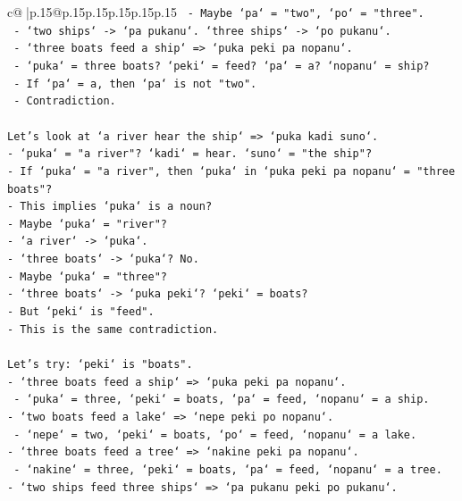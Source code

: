 \documentclass{article}
\begin{document}
{\begin{supertabular}{c@{$\;$}|p{.15\linewidth}@{}p{.15\linewidth}p{.15\linewidth}p{.15\linewidth}p{.15\linewidth}p{.15\linewidth}}
{{{\texttt{  {-} Maybe `pa` = "two", `po` = "three".} \\
\texttt{  {-} `two ships` {-}> `pa pukanu`. `three ships` {-}> `po pukanu`.} \\
\texttt{  {-} `three boats feed a ship` => `puka peki pa nopanu`.} \\
\texttt{    {-} `puka` = three boats? `peki` = feed? `pa` = a? `nopanu` = ship?} \\
\texttt{    {-} If `pa` = a, then `pa` is not "two".} \\
\texttt{    {-} Contradiction.} \\
\\ 
\texttt{Let's look at `a river hear the ship` => `puka kadi suno`.} \\
\texttt{{-} `puka` = "a river"? `kadi` = hear. `suno` = "the ship"?} \\
\texttt{{-} If `puka` = "a river", then `puka` in `puka peki pa nopanu` = "three boats"?} \\
\texttt{{-} This implies `puka` is a noun?} \\
\texttt{{-} Maybe `puka` = "river"?} \\
\texttt{{-} `a river` {-}> `puka`.} \\
\texttt{{-} `three boats` {-}> `puka`? No.} \\
\texttt{{-} Maybe `puka` = "three"?} \\
\texttt{{-} `three boats` {-}> `puka peki`? `peki` = boats?} \\
\texttt{{-} But `peki` is "feed".} \\
\texttt{{-} This is the same contradiction.} \\
\\ 
\texttt{Let's try: `peki` is "boats".} \\
\texttt{{-} `three boats feed a ship` => `puka peki pa nopanu`.} \\
\texttt{  {-} `puka` = three, `peki` = boats, `pa` = feed, `nopanu` = a ship.} \\
\texttt{{-} `two boats feed a lake` => `nepe peki po nopanu`.} \\
\texttt{  {-} `nepe` = two, `peki` = boats, `po` = feed, `nopanu` = a lake.} \\
\texttt{{-} `three boats feed a tree` => `nakine peki pa nopanu`.} \\
\texttt{  {-} `nakine` = three, `peki` = boats, `pa` = feed, `nopanu` = a tree.} \\
\texttt{{-} `two ships feed three ships` => `pa pukanu peki po pukanu`.} \\
}}}
\end{supertabular}}
\end{document}
